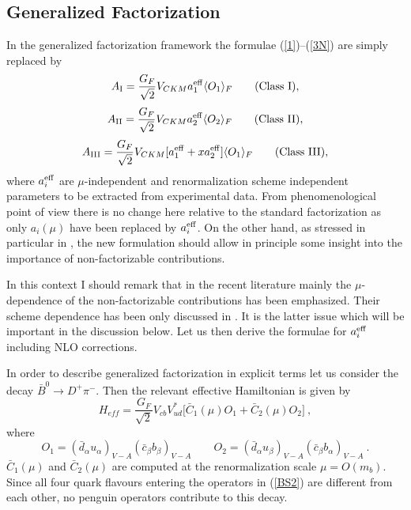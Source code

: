 \subsection{Generalized Factorization}
In the generalized factorization framework the formulae 
(\ref{1})--(\ref{3N}) are simply replaced by
\begin{equation}\label{1a}
A_{\rm I}=\frac{G_F}{\sqrt{2}} V_{CKM}
a^{\rm eff}_1\langle O_1\rangle_F 
\qquad {\rm (Class~I)},
\end{equation}
\begin{equation}\label{2a}
A_{\rm II}=\frac{G_F}{\sqrt{2}} V_{CKM}
a^{\rm eff}_2\langle O_2\rangle_F 
\qquad {\rm (Class~II)},
\end{equation}
\begin{equation}\label{3a}
A_{\rm III}=
\frac{G_F}{\sqrt{2}} V_{CKM}
[a^{\rm eff}_1+x a^{\rm eff}_2]\langle O_1\rangle_F
 \qquad {\rm (Class~III)},
\end{equation}
where $a^{\rm eff}_i$ are $\mu$-independent and renormalization
scheme independent parameters to be extracted from experimental data.
From phenomenological point of view there is no change here
relative to the standard factorization as only $a_i(\mu)$ have
been replaced by $a^{\rm eff}_i$. On the other hand, as stressed 
in particular in \cite{NS97}, the new formulation should allow in 
principle some insight into the importance of non-factorizable
contributions.  

In this context I should remark that in the recent literature
mainly the $\mu$-dependence of the non-factorizable contributions
has been emphasized. Their scheme dependence has  been only discussed
in \cite{AJB94a}. It is the latter issue which will be important in
the discussion below. Let us then derive the formulae for
$a_i^{\rm eff}$ including NLO corrections. 

In order to describe generalized factorization in explicit terms
let us consider the decay
$\bar B^0\to D^+\pi^-$. Then the
relevant effective Hamiltonian is given by
\begin{equation}\label{BS1}
H_{eff}=\frac{G_F}{\sqrt{2}}V_{cb}V_{ud}^{*}
\lbrack \bar C_1(\mu) O_1+\bar C_2(\mu)O_2 \rbrack~,
\end{equation}
where
\begin{equation}\label{BS2}
O_1=(\bar d_\alpha u_\alpha)_{V-A} (\bar c_\beta b_\beta)_{V-A}
\qquad 
O_2=(\bar d_\alpha u_\beta)_{V-A} (\bar c_\beta b_\alpha)_{V-A}~.
\end{equation}
$\bar C_1(\mu)$ and $\bar C_2(\mu)$ are 
computed at the renormalization scale $\mu=O(m_b)$.
Since all four quark flavours entering the operators in (\ref{BS2})
are different from each other, no penguin operators contribute to
this decay. 

